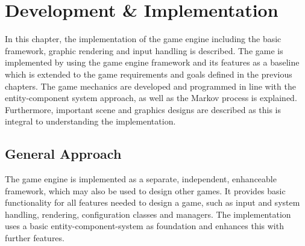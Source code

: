
\chapter{Development \& Implementation}\label{ch:implementation}
In this chapter, the implementation of the game engine including the basic framework, graphic rendering and input handling is described.
The game is implemented by using the game engine framework and its features as a baseline which is extended to the game requirements and goals
defined in the previous chapters.
The game mechanics are developed and programmed in line with the entity-component system approach, as well as the Markov process is explained.
Furthermore, important scene and graphics designs are described as this is integral to understanding the implementation.

\section{General Approach}\label{sec:general-approach}
The game engine is implemented as a separate, independent, enhanceable framework, which may also be used to design other
games.
It provides basic functionality for all features needed to design a game, such as input and system handling, rendering, configuration
classes and managers.
The implementation uses a basic entity-component-system as foundation and enhances this with further features.

